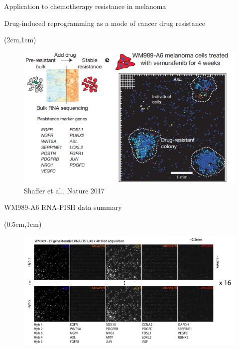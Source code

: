 \documentclass[aspectratio=1610]{beamer}					%
\begin{document}
\begin{section}{Application to chemotherapy resistance in melanoma}
\begin{frame}{Drug-induced
reprogramming as a mode of cancer drug resistance}

\begin{textblock*}{12cm}(2cm,1cm)
\begin{figure}
\includegraphics[width=12cm]{resistance.png}
\caption{Shaffer et al., Nature 2017}
\end{figure}
\end{textblock*}

\end{frame}

\begin{frame}{WM989-A6 RNA-FISH data summary}

\begin{textblock*}{15cm}(0.5cm,1cm)
\begin{figure}
\includegraphics[width=15cm]{data-summary.png}
\end{figure}
\end{textblock*}

\end{frame}


\end{section}
\end{document}
